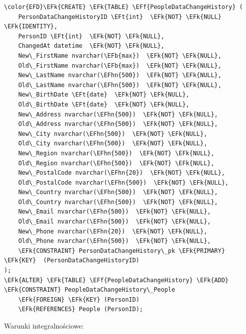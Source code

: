 \documentclass[11pt]{article}
\newcommand{\EFk}[1]{\textcolor{EFk}{\textbf{#1}}} %
\newcommand{\EFb}[1]{\textcolor{EFb}{\textbf{#1}}} %
\newcommand{\EFf}[1]{\textcolor{EFf}{#1}} %
\newcommand{\EFt}[1]{\textcolor{EFt}{\textbf{#1}}} %
\newcommand{\EFhn}[1]{\textcolor{EFhn}{#1}} %
\begin{document}
\begin{Code}
\begin{Verbatim}
\color{EFD}\EFk{CREATE} \EFk{TABLE} \EFf{PeopleDataChangeHistory} (
    PersonDataChangeHistoryID \EFt{int}  \EFk{NOT} \EFk{NULL} \EFk{IDENTITY},
    PersonID \EFt{int}  \EFk{NOT} \EFk{NULL},
    ChangedAt datetime  \EFk{NOT} \EFk{NULL},
    New\_FirstName nvarchar(\EFb{max})  \EFk{NOT} \EFk{NULL},
    Old\_FirstName nvarchar(\EFb{max})  \EFk{NOT} \EFk{NULL},
    New\_LastName nvarchar(\EFhn{500})  \EFk{NOT} \EFk{NULL},
    Old\_LastName nvarchar(\EFhn{500})  \EFk{NOT} \EFk{NULL},
    New\_BirthDate \EFt{date}  \EFk{NOT} \EFk{NULL},
    Old\_BirthDate \EFt{date}  \EFk{NOT} \EFk{NULL},
    New\_Address nvarchar(\EFhn{500})  \EFk{NOT} \EFk{NULL},
    Old\_Address nvarchar(\EFhn{500})  \EFk{NOT} \EFk{NULL},
    New\_City nvarchar(\EFhn{500})  \EFk{NOT} \EFk{NULL},
    Old\_City nvarchar(\EFhn{500})  \EFk{NOT} \EFk{NULL},
    New\_Region nvarchar(\EFhn{500})  \EFk{NOT} \EFk{NULL},
    Old\_Region nvarchar(\EFhn{500})  \EFk{NOT} \EFk{NULL},
    New\_PostalCode nvarchar(\EFhn{20})  \EFk{NOT} \EFk{NULL},
    Old\_PostalCode nvarchar(\EFhn{500})  \EFk{NOT} \EFk{NULL},
    New\_Country nvarchar(\EFhn{500})  \EFk{NOT} \EFk{NULL},
    Old\_Country nvarchar(\EFhn{500})  \EFk{NOT} \EFk{NULL},
    New\_Email nvarchar(\EFhn{500})  \EFk{NOT} \EFk{NULL},
    Old\_Email nvarchar(\EFhn{500})  \EFk{NOT} \EFk{NULL},
    New\_Phone nvarchar(\EFhn{20})  \EFk{NOT} \EFk{NULL},
    Old\_Phone nvarchar(\EFhn{500})  \EFk{NOT} \EFk{NULL},
    \EFk{CONSTRAINT} PersonDataChangeHistory\_pk \EFk{PRIMARY} \EFk{KEY}  (PersonDataChangeHistoryID)
);
\EFk{ALTER} \EFk{TABLE} \EFf{PeopleDataChangeHistory} \EFk{ADD} \EFk{CONSTRAINT} PeopleDataChangeHistory\_People
    \EFk{FOREIGN} \EFk{KEY} (PersonID)
    \EFk{REFERENCES} People (PersonID);
\end{Verbatim}
\end{Code}
Warunki integralnościowe:
\end{document}
